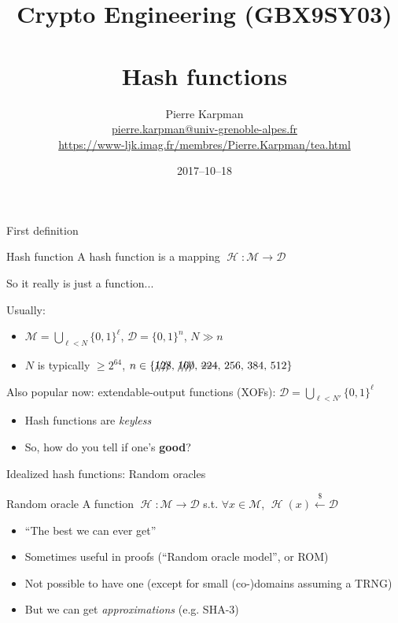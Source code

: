 \documentclass[xcolor=table,usenames,dvipsnames,compress]{beamer}
\title[Hash functions]{Crypto Engineering (GBX9SY03)\\
\decosix\\
Hash functions}
\author[]{Pierre Karpman\\
\url{pierre.karpman@univ-grenoble-alpes.fr}\\
{\footnotesize\url{https://www-ljk.imag.fr/membres/Pierre.Karpman/tea.html}}}
\date{2017--10--18}
\newcommand\randraw{\xleftarrow{{\scriptscriptstyle\$}}}
\DeclareMathOperator\hash{\mathcal{H}}
\newcommand\ms{\mathcal{M}}
\newcommand\ds{\mathcal{D}}
\begin{document}
\begin{frame}
  \titlepage
\end{frame}

%

\begin{frame}{First definition}
\begin{exampleblock}{Hash function}
A hash function is a mapping $\hash : \ms \rightarrow \ds$
\end{exampleblock}
{\footnotesize So it really is just a function...}
\medskip

Usually:
\begin{itemize}
\item $\ms = \bigcup_{\ell < N} \{0,1\}^\ell$, $\ds = \{0,1\}^n$, $N \gg n$
\item $N$ is typically $\geq 2^{64}$, $n \in \{\text{\xout{128}, \xout{160}, \sout{224}, 256, 384, 512}\}$
\end{itemize}
{\footnotesize Also popular now: extendable-output functions (XOFs): $\ds = \bigcup_{\ell < N'} \{0,1\}^\ell$ }

\begin{itemize}
\item Hash functions are \emph{keyless}
\item So, how do you tell if one's \textbf{good}?
\end{itemize}
\end{frame}

\begin{frame}{Idealized hash functions: Random oracles}
\begin{exampleblock}{Random oracle}
A function $\hash : \ms \rightarrow \ds$ s.t. $\forall x \in \ms$, $\hash(x) \randraw \ds$
\end{exampleblock}
\begin{itemize}
\item ``The best we can ever get''
\item Sometimes useful in proofs (``Random oracle model'', or ROM)
\item Not possible to have one {\footnotesize(except for small (co-)domains assuming a TRNG)}
\item But we can get \emph{approximations} (e.g. SHA-3)
\end{itemize}
\end{frame}
\end{document}
